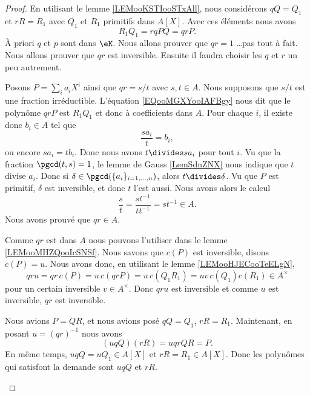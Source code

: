 \begin{proof}
	En utilisant le lemme \ref{LEMooKSTIooSTxAll}, nous considérons \( qQ=Q_1\) et \( rR=R_1\) avec \( Q_1\) et \( R_1\) primitifs dans \( A[X]\). Avec ces éléments nous avons
	\begin{equation}		\label{EQooMGXYooIAFBgy}
		R_1Q_1=rqPQ=qrP.
	\end{equation}
	À priori \( q\) et \( p\) sont dans \( \eK\). Nous allons prouver que \( qr=1\) \ldots pas tout à fait. Nous allons prouver que \( qr\) est inversible. Ensuite il faudra choisir les \( q\) et \( r\) un peu autrement.
	\begin{subproof}
		\spitem[\( qr\in A\)]
		Posons \( P=\sum_ia_iX^i\) ainsi que \( qr=s/t\) avec \( s,t\in A\). Nous supposons que \( s/t\) est une fraction irréductible. L'équation \eqref{EQooMGXYooIAFBgy} nous dit que le polynôme \( qrP\) est \( R_1Q_1\) et donc à coefficients dans \( A\). Pour chaque \( i\), il existe donc \( b_i\in A\) tel que
		\begin{equation}
			\frac{ sa_i }{ t }=b_i,
		\end{equation}
		ou encore \( sa_i=tb_i\). Donc nous avons \( t\divides sa_i\) pour tout \( i\). Vu que la fraction \( \pgcd(t,s)=1\), le lemme de Gauss \ref{LemSdnZNX} nous indique que \( t\) divise \( a_i\). Donc si \( \delta\in \pgcd(\{ a_i \}_{i=1,\ldots,n})\), alors \( t\divides \delta\). Vu que \( P\) est primitif, \( \delta\) est inversible, et donc \( t\) l'est aussi. Nous avons alors le calcul
		\begin{equation}
			\frac{ s }{ t }=\frac{ st^{-1} }{ tt^{-1} }=st^{-1}\in A.
		\end{equation}
		Nous avons prouvé que \( qr\in A\).


		Comme \( qr\) est dans \( A\) nous pouvons l'utiliser dans le lemme \ref{LEMooMHZQooIcSNSf}. Nous savons que \( c(P)\) est inversible, disons \( c(P)=u\). Nous avons donc, en utilisant le lemme \ref{LEMooHJECooTeELgN},
		\begin{equation}
			qru=qr\,c(P)=u\,c(qrP)=u\,c(Q_1R_1)=uv\,c(Q_1)c(R_1)\in A^{\times}
		\end{equation}
		pour un certain inversible \( v\in A^{\times}\). Donc \( qru\) est inversible et comme \( u\) est inversible, \( qr\) est inversible.

		\spitem[Conclusion]

		Nous avions \( P=QR\), et nous avions posé \( qQ=Q_1\), \( rR=R_1\). Maintenant, en posant \( u=(qr)^{-1}\) nous avons
		\begin{equation}
			(uqQ)(rR)=uqrQR=P.
		\end{equation}
		En même temps, \( uqQ=uQ_1\in A[X]\) et \( rR=R_1\in A[X]\). Donc les polynômes qui satisfont la demande sont \( uqQ\) et \( rR\).
	\end{subproof}
\end{proof}


